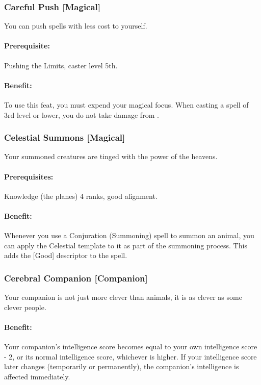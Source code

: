 \subsubsection[Careful Push]{Careful Push [Magical]}
\label{Feat:CarefulPush}
You can push spells with less cost to yourself.

\paragraph{Prerequisite:} Pushing the Limits, caster level 5th.

\paragraph{Benefit:} To use this feat, you must expend your magical focus. When casting a spell of 3rd level or lower, you do not take damage from .
\subsubsection[Celestial Summons]{Celestial Summons [Magical]}
\label{Feat:CelestialSummons}
Your summoned creatures are tinged with the power of the heavens.

\paragraph{Prerequisites:} Knowledge (the planes) 4 ranks, good alignment.

\paragraph{Benefit:} Whenever you use a Conjuration (Summoning) spell to summon an animal, you can apply the Celestial template to it as part of the summoning process. This adds the [Good] descriptor to the spell.
\subsubsection[Cerebral Companion]{Cerebral Companion [Companion]}
\label{Feat:CerebralCompanion}
Your companion is not just more clever than animals, it is as clever as some clever people.

\paragraph{Benefit:} Your companion's intelligence score becomes equal to your own intelligence score - 2, or its normal intelligence score, whichever is higher. If your intelligence score later changes (temporarily or permanently), the companion's intelligence is affected immediately.

